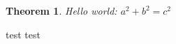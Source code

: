 \documentclass{elsarticle}
\newtheorem{theorem}{Theorem}
\begin{document}
\begin{theorem}\label{thm:10095}
  Hello world: $a^2 + b^2 = c^2$
\end{theorem}

test  test
\end{document}
